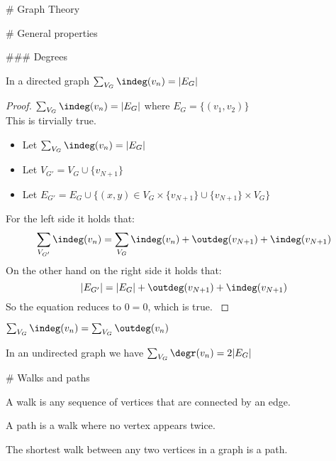 # Graph Theory

# General properties

### Degrees

\begin{theorem} \label{sumIndegreesIsNrEdges}
    In a directed graph $\sum_{V_G} \indeg(v_n) = |E_G|$
\end{theorem}

\begin{proof}
    {$\sum_{V_G} \indeg(v_n) = |E_G|$ where $E_G = \{(v_1, v_2)\}$ \\}
    {This is tirvially true.}
    {
    \begin{itemize}
        \item Let $\sum_{V_G} \indeg(v_n) = |E_G|$ 
        \item Let $V_{G'} = V_G \cup \{v_{N+1}\}$
        \item Let $E_{G'} = E_G \cup \{(x, y) \in V_G \times \{v_{N+1}\} \cup \{v_{N+1}\} \times V_G \}$
    \end{itemize}
    }
    {
     For the left side it holds that: 
                $$ \sum_{V_{G'}} \indeg(v_n) = \sum_{V_G} \indeg(v_n) + \outdeg(v_{N+1}) + \indeg(v_{N+1}) $$
                On the other hand on the right side it holds that: 
                $$ |E_{G'}| = |E_G| + \outdeg(v_{N+1}) + \indeg(v_{N+1}) $$
                So the equation reduces to $0=0$, which is true.
    }
\end{proof}


\begin{lemma} \label{indegIsOutdeg}
    $\sum_{V_G} \indeg(v_n) = \sum_{V_G} \outdeg(v_n)$
\end{lemma}

\begin{lemma}
    In an undirected graph we have $\sum_{V_G} \degr(v_n) = 2|E_G|$
\end{lemma}

# Walks and paths

\begin{definition}
    A walk is any sequence of vertices that are connected by an edge.
\end{definition}

\begin{definition}
    A path is a walk where no vertex appears twice.
\end{definition}

\begin{theorem}
    The shortest walk between any two vertices in a graph is a path.
\end{theorem}

